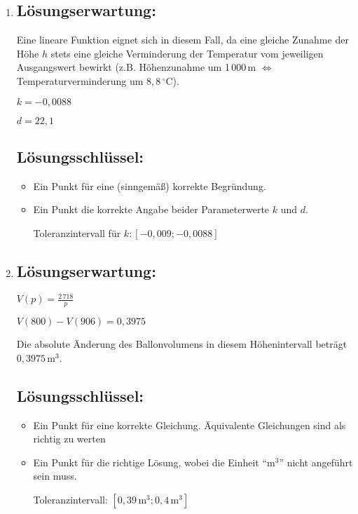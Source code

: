 \begin{langesbeispiel}
{\begin{enumerate}
\begin{itemize}
		Toleranzintervall: $[-0,12; -0,115]$ bzw. $[-12\,\%;-11,5\,\%]$ 
		\item Ein Punkt für eine (sinngemäß) korrekte Begründung.
	\end{itemize}
	
	\item \subsection{Lösungserwartung:}
			
	Eine lineare Funktion eignet sich in diesem Fall, da eine gleiche Zunahme der Höhe $h$ stets eine gleiche Verminderung der Temperatur vom jeweiligen Ausgangswert bewirkt (z.B. Höhenzunahme um 1\,000\,m $\Leftrightarrow$ Temperaturverminderung um $8,8\,^\circ$C). 
	
	$k=-0,0088$ 
	
	$d=22,1$

	\subsection{Lösungsschlüssel:}
	
\begin{itemize}
	\item Ein Punkt für eine (sinngemäß) korrekte Begründung.
	\item   Ein Punkt die korrekte Angabe beider Parameterwerte $k$ und $d$. 
	
	Toleranzintervall für $k: [-0,009; -0,0088]$
\end{itemize}

\item \subsection{Lösungserwartung:}
			
	$V(p)=\frac{2\,718}{p}$
	
	$V(800)-V(906)=0,3975$
	
	Die absolute Änderung des Ballonvolumens in diesem Höhenintervall beträgt $0,3975\,$m$^3$.
	\subsection{Lösungsschlüssel:}
	
\begin{itemize}
	\item Ein Punkt für eine korrekte Gleichung. Äquivalente Gleichungen sind als richtig zu werten
	\item Ein Punkt für die richtige Lösung, wobei die Einheit "`m$^3$"' nicht angeführt sein muss.  
	
	Toleranzintervall: $[0,39\,\text{m}^3; 0,4\,\text{m}^3]$
\end{itemize}

\end{enumerate}}
		\end{langesbeispiel}